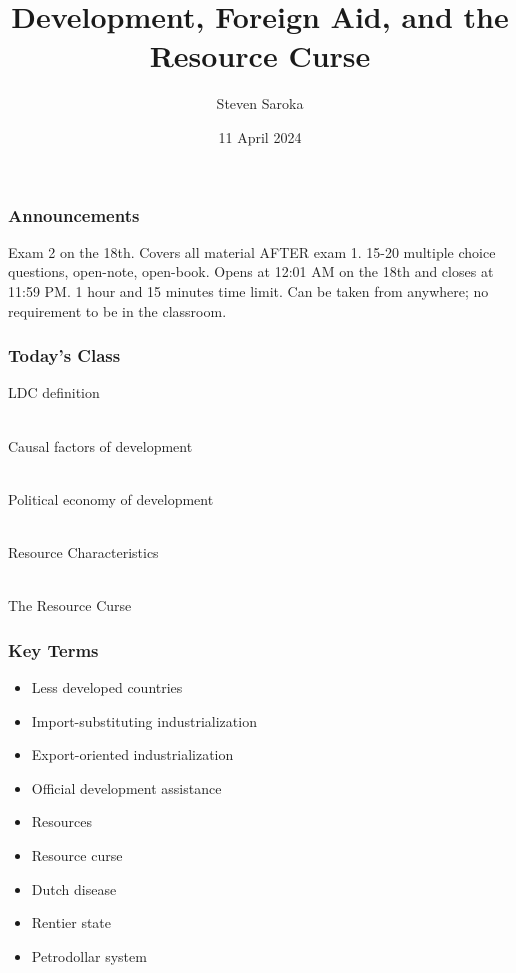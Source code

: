 \documentclass{beamer}
\title[Development and Foreign Aid]{\LARGE{Development, Foreign Aid, and the Resource Curse}}
\author[POLI 150]{Steven Saroka}
\institute{POLI 150}
\date{11 April 2024}
\begin{document}
\begin{frame}
\titlepage %
\end{frame}



\begin{frame} 
	\frametitle{\LARGE{Announcements}}
	\begin{itemize}
		\Large{
			\item Exam 2 on the 18th. Covers all material AFTER exam 1. 15-20 multiple choice questions, open-note, open-book. Opens at 12:01 AM on the 18th and closes at 11:59 PM. 1 hour and 15 minutes time limit. Can be taken from anywhere; no requirement to be in the classroom.
			
		}
	\end{itemize}
\end{frame}

\begin{frame} 
	\frametitle{\LARGE{Today's Class}}
	\begin{itemize}
		\Large{
			\item LDC definition
			\\~\\
			\item Causal factors of development
			\\~\\
			\item Political economy of development
			\\~\\
			\item Resource Characteristics 
			\\~\\ 
			\item The Resource Curse   
		}
	\end{itemize}
\end{frame}

\begin{frame} 
	\frametitle{\LARGE{Key Terms}}
	\begin{itemize}
		\item Less developed countries
		\item Import-substituting industrialization
		\item Export-oriented industrialization 
		\item Official development assistance
		\item Resources
		\item Resource curse
		\item Dutch disease
		\item Rentier state
		\item Petrodollar system
	\end{itemize}
\end{frame}
\end{document}
